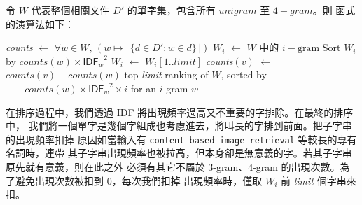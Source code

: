 令 $W$ 代表整個相關文件 $D'$ 的單字集，包含所有 $unigram$ 至 $4-gram$。則
 函式的演算法如下：

\begin{algorithmic}
    \State \textit{counts} $\gets$ $\forall w\in W,\,\left(w\mapsto|\,\{d\in D':w\in d\}\,|\right)$
      \State $W_i$ $\gets$ $W$ 中的 $i-\text{gram}$
      \State Sort $W_i$ by $\mathit{counts}(w)\times {\mathsf{IDF}_w}^2$
      \State $W_i$ $\gets$ $W_i[1..\mathit{limit}]$
          \State \textit{counts}$(v)$ $\gets$ $\mathit{counts}(v)-\mathit{counts}(w)$
        \EndFor
      \EndFor
    \EndFor
    \State\Return top \textit{limit} ranking of $W$, sorted by
    \State   $\;\;\;\;\;\;\;\mathit{counts}(w)\times{\mathsf{IDF}_w}^2\times i$ for an $i$-gram $w$
  \EndFunction

  在排序過程中，我們透過 \textsf{IDF} 將出現頻率過高又不重要的字排除。在最終的排序中，
  我們將一個單字是幾個字組成也考慮進去，將叫長的字排到前面。把子字串的出現頻率扣掉
  原因如當輸入有 \texttt{content based image retrieval} 等較長的專有名詞時，連帶
  其子字串出現頻率也被拉高，但本身卻是無意義的字。若其子字串原先就有意義，則在此之外
  必須有其它不屬於 3-gram、4-gram 的出現次數。為了避免出現次數被扣到 0，每次我們扣掉
  出現頻率時，僅取 $W_i$ 前 \textit{limit} 個字串來扣。
\end{algorithmic}
